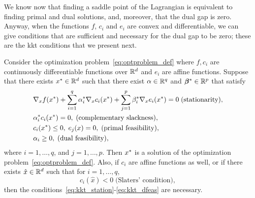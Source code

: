 %
We know now that finding a saddle point of the Lagrangian is equivalent to finding primal and dual solutions, and, moreover, that the dual gap is zero.
Anyway, when the functions $f$, $c_i$ and $e_i$ are convex and differentiable, we can give conditions that are sufficient and necessary for the dual gap to be zero; these are the \acrshort{kkt} conditions that we present next.
\begin{theorem}\label{th:kkt_conditions}
    Consider the optimization problem~\eqref{eq:optproblem_def} where $f, c_i$ are continuously differentiable functions over $\mathbb{R}^d$ and $e_i$ are affine functions. Suppose that there exists ${x}^* \in \mathbb{R}^d$ such that there exist $\alpha \in \mathbb{R}^q$ and ${\bm{\beta}}^* \in \mathbb{R}^p$ that satisfy
    \begin{align}
        &\nabla_x f(\opt{x}) + \sum_{i=1}^q \opt{\alpha}_i \nabla_x c_i(\opt{x}) + \sum_{j=1}^p \opt{\beta}_i \nabla_x e_i(\opt{x}) = 0 \; \text{(stationarity)}, \label{eq:kkt_station} \\
        &\opt{\alpha}_i c_i(\opt{x}) = 0, \; \text{(complementary slackness)}, \label{eq:kkt_comp}\\
        &c_i(\opt{x}) \leq 0 , \; e_j(x) = 0, \; \text{(primal feasibility)}, \label{eq:kkt_pfeas}\\
        &\alpha_i \geq 0,\;  \text{(dual feasibility)} , \label{eq:kkt_dfeas}
    \end{align}  
    where $i=1, \ldots, q$, and $j=1, \ldots, p$. Then ${x}^*$ is a solution of the optimization problem~\eqref{eq:optproblem_def}.
    Also, if $c_i$ are affine functions as well, or if there exists $\hat{x} \in \mathbb{R}^d$ such that for $i=1, \ldots, q$, 
    \begin{equation}
        \nonumber
        c_i(\hat{x}) < 0 \; \text{(Slaters' condition)},
    \end{equation}
    then the conditions~\eqref{eq:kkt_station}-\eqref{eq:kkt_dfeas} are necessary.
\end{theorem}
